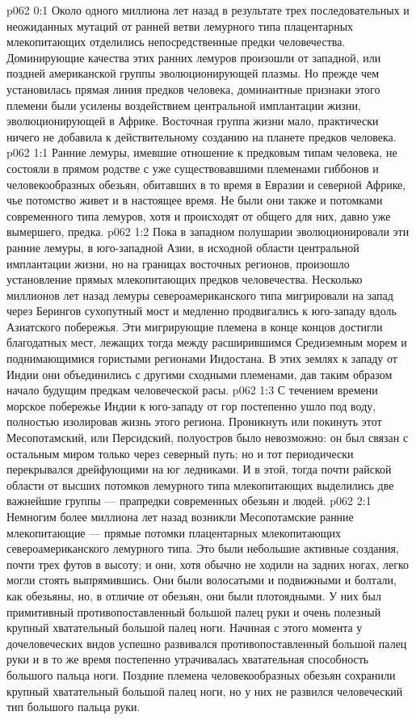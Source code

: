 \author{Носитель Жизни}
\vs p062 0:1 Около одного миллиона лет назад в результате трех последовательных и неожиданных мутаций от ранней ветви лемурного типа плацентарных млекопитающих отделились непосредственные предки человечества. Доминирующие качества этих ранних лемуров произошли от западной, или поздней американской группы эволюционирующей плазмы. Но прежде чем установилась прямая линия предков человека, доминантные признаки этого племени были усилены воздействием центральной имплантации жизни, эволюционирующей в Африке. Восточная группа жизни мало, практически ничего не добавила к действительному созданию на планете предков человека.
\vs p062 1:1 Ранние лемуры, имевшие отношение к предковым типам человека, не состояли в прямом родстве с уже существовавшими племенами гиббонов и человекообразных обезьян, обитавших в то время в Евразии и северной Африке, чье потомство живет и в настоящее время. Не были они также и потомками современного типа лемуров, хотя и происходят от общего для них, давно уже вымершего, предка.
\vs p062 1:2 Пока в западном полушарии эволюционировали эти ранние лемуры, в юго\hyp{}западной Азии, в исходной области центральной имплантации жизни, но на границах восточных регионов, произошло установление прямых млекопитающих предков человечества. Несколько миллионов лет назад лемуры североамериканского типа мигрировали на запад через Берингов сухопутный мост и медленно продвигались к юго\hyp{}западу вдоль Азиатского побережья. Эти мигрирующие племена в конце концов достигли благодатных мест, лежащих тогда между расширившимся Средиземным морем и поднимающимися гористыми регионами Индостана. В этих землях к западу от Индии они объединились с другими сходными племенами, дав таким образом начало будущим предкам человеческой расы.
\vs p062 1:3 С течением времени морское побережье Индии к юго\hyp{}западу от гор постепенно ушло под воду, полностью изолировав жизнь этого региона. Проникнуть или покинуть этот Месопотамский, или Персидский, полуостров было невозможно: он был связан с остальным миром только через северный путь; но и тот периодически перекрывался дрейфующими на юг ледниками. И в этой, тогда почти райской области от высших потомков лемурного типа млекопитающих выделились две важнейшие группы --- прапредки современных обезьян и людей.
\vs p062 2:1 Немногим более миллиона лет назад  возникли Месопотамские ранние млекопитающие --- прямые потомки плацентарных млекопитающих североамериканского лемурного типа. Это были небольшие активные создания, почти трех футов в высоту; и они, хотя обычно не ходили на задних ногах, легко могли стоять выпрямившись. Они были волосатыми и подвижными и болтали, как обезьяны, но, в отличие от обезьян, они были плотоядными. У них был примитивный противопоставленный большой палец руки и очень полезный крупный хватательный большой палец ноги. Начиная с этого момента у дочеловеческих видов успешно развивался противопоставленный большой палец руки и в то же время постепенно утрачивалась хватательная способность большого пальца ноги. Поздние племена человекообразных обезьян сохранили крупный хватательный большой палец ноги, но у них не развился человеческий тип большого пальца руки.
